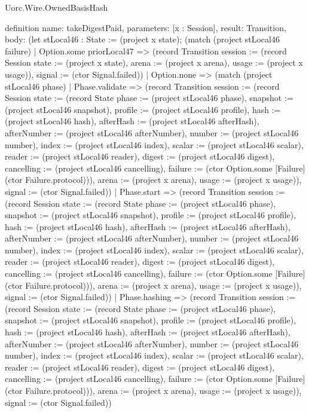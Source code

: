 \begin{lexlean}{Uorc.Wire.OwnedBasisHash}
\begin{semanticmodule}
definition{
  name: takeDigestPaid,
  parameters: [x : Session],
  result: Transition,
  body: (let stLocal46 : State := (project x state); (match (project stLocal46 failure)
    | Option.some priorLocal47 => (record Transition {session := (record Session {state := (project x state), arena := (project x arena), usage := (project x usage)}), signal := (ctor Signal.failed)})
    | Option.none => (match (project stLocal46 phase)
      | Phase.validate => (record Transition {session := (record Session {state := (record State {phase := (project stLocal46 phase), snapshot := (project stLocal46 snapshot), profile := (project stLocal46 profile), hash := (project stLocal46 hash), afterHash := (project stLocal46 afterHash), afterNumber := (project stLocal46 afterNumber), number := (project stLocal46 number), index := (project stLocal46 index), scalar := (project stLocal46 scalar), reader := (project stLocal46 reader), digest := (project stLocal46 digest), cancelling := (project stLocal46 cancelling), failure := (ctor Option.some [Failure] (ctor Failure.protocol))}), arena := (project x arena), usage := (project x usage)}), signal := (ctor Signal.failed)})
      | Phase.start => (record Transition {session := (record Session {state := (record State {phase := (project stLocal46 phase), snapshot := (project stLocal46 snapshot), profile := (project stLocal46 profile), hash := (project stLocal46 hash), afterHash := (project stLocal46 afterHash), afterNumber := (project stLocal46 afterNumber), number := (project stLocal46 number), index := (project stLocal46 index), scalar := (project stLocal46 scalar), reader := (project stLocal46 reader), digest := (project stLocal46 digest), cancelling := (project stLocal46 cancelling), failure := (ctor Option.some [Failure] (ctor Failure.protocol))}), arena := (project x arena), usage := (project x usage)}), signal := (ctor Signal.failed)})
      | Phase.hashing => (record Transition {session := (record Session {state := (record State {phase := (project stLocal46 phase), snapshot := (project stLocal46 snapshot), profile := (project stLocal46 profile), hash := (project stLocal46 hash), afterHash := (project stLocal46 afterHash), afterNumber := (project stLocal46 afterNumber), number := (project stLocal46 number), index := (project stLocal46 index), scalar := (project stLocal46 scalar), reader := (project stLocal46 reader), digest := (project stLocal46 digest), cancelling := (project stLocal46 cancelling), failure := (ctor Option.some [Failure] (ctor Failure.protocol))}), arena := (project x arena), usage := (project x usage)}), signal := (ctor Signal.failed)})
}
\end{semanticmodule}
\end{lexlean}
